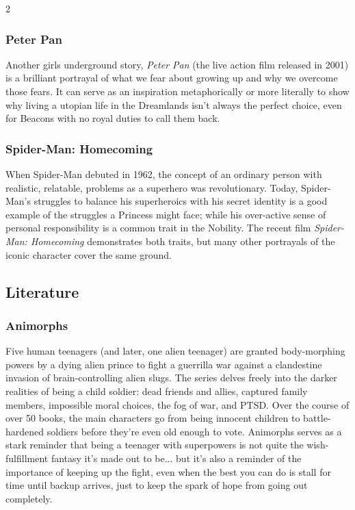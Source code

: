 \begin{multicols}{2}
\subsubsection*{Peter Pan}

Another girls underground story, \textit{Peter Pan} (the live action film released in 2001) is a brilliant portrayal of what we fear about growing up and why we overcome those fears. It can serve as an inspiration metaphorically or more literally to show why living a utopian life in the Dreamlands isn't always the perfect choice, even for Beacons with no royal duties to call them back. 

\subsubsection*{Spider-Man: Homecoming}

When Spider-Man debuted in 1962, the concept of an ordinary person with realistic, relatable, problems as a superhero was revolutionary. Today, Spider-Man's struggles to balance his superheroics with his secret identity is a good example of the struggles a Princess might face; while his over-active sense of personal responsibility is a common trait in the Nobility. The recent film \textit{Spider-Man: Homecoming} demonstrates both traits, but many other portrayals of the iconic character cover the same ground. 

\subsection*{Literature}

\subsubsection*{Animorphs}

Five human teenagers (and later, one alien teenager) are granted body-morphing powers by a dying alien prince to fight a guerrilla war against a clandestine invasion of brain-controlling alien slugs. The series delves freely into the darker realities of being a child soldier: dead friends and allies, captured family members, impossible moral choices, the fog of war, and PTSD. Over the course of over 50 books, the main characters go from being innocent children to battle-hardened soldiers before they're even old enough to vote. Animorphs serves as a stark reminder that being a teenager with superpowers is not quite the wish-fulfillment fantasy it's made out to be... but it's also a reminder of the importance of keeping up the fight, even when the best you can do is stall for time until backup arrives, just to keep the spark of hope from going out completely.


\end{multicols}
